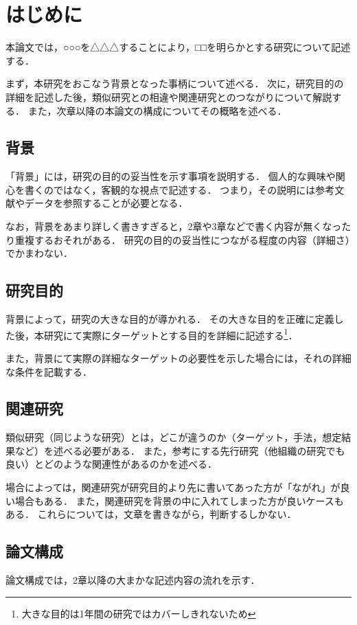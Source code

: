 \documentclass[a4paper,11pt,oneside,openany]{jsbook}
\begin{document}
\chapter{はじめに}
本論文では，○○○を△△△することにより，□□を明らかとする研究について記述する．

まず，本研究をおこなう背景となった事柄について述べる．
次に，研究目的の詳細を記述した後，類似研究との相違や関連研究とのつながりについて解説する．
また，次章以降の本論文の構成についてその概略を述べる．

\section{背景}
「背景」には，研究の目的の妥当性を示す事項を説明する．
個人的な興味や関心を書くのではなく，客観的な視点で記述する．
つまり，その説明には参考文献やデータを参照することが必要となる．

なお，背景をあまり詳しく書きすぎると，2章や3章などで書く内容が無くなったり重複するおそれがある．
研究の目的の妥当性につながる程度の内容（詳細さ）でかまわない．

\section{研究目的}
背景によって，研究の大きな目的が導かれる．
その大きな目的を正確に定義した後，本研究にて実際にターゲットとする目的を詳細に記述する\footnote{大きな目的は1年間の研究ではカバーしきれないため}．

また，背景にて実際の詳細なターゲットの必要性を示した場合には，それの詳細な条件を記載する．

\section{関連研究}
類似研究（同じような研究）とは，どこが違うのか（ターゲット，手法，想定結果など）を述べる必要がある．
また，参考にする先行研究（他組織の研究でも良い）とどのような関連性があるのかを述べる．

場合によっては，関連研究が研究目的より先に書いてあった方が「ながれ」が良い場合もある．
また，関連研究を背景の中に入れてしまった方が良いケースもある．
これらについては，文章を書きながら，判断するしかない．

\section{論文構成}
論文構成では，2章以降の大まかな記述内容の流れを示す．
\end{document}
